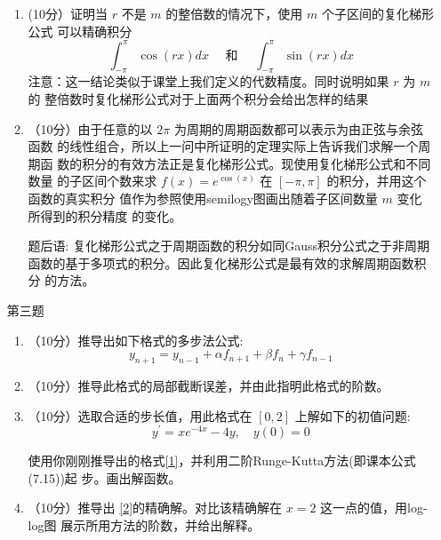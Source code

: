 \documentclass[12pt,a4paper,UTF8]{ctexart}
\theoremstyle{nonumberplain}
\begin{document}
\begin{enumerate}
          \begin{enumerate}
              \item
                    (10分）证明当 $r$ 不是 $m$ 的整倍数的情况下，使用 $m$ 个子区间的复化梯形公式
                    可以精确积分
                    $$
                        \int_{-\pi}^{\pi} \cos (r x) d x \quad \text { 和 } \quad \int_{-\pi}^{\pi} \sin (r x) d x
                    $$
                    注意：这一结论类似于课堂上我们定义的代数精度。同时说明如果 $r$ 为 $m$ 的
                    整倍数时复化梯形公式对于上面两个积分会给出怎样的结果
              \item （10分）由于任意的以 $2 \pi$ 为周期的周期函数都可以表示为由正弦与余弦函数 的线性组合，所以上一问中所证明的定理实际上告诉我们求解一个周期函 数的积分的有效方法正是复化梯形公式。现使用复化梯形公式和不同数量 的子区间个数来求 $f(x)=e^{\cos (x)}$ 在 $[-\pi, \pi]$ 的积分，并用这个函数的真实积分 值作为参照使用semilogy图画出随着子区间数量 $m$ 变化所得到的积分精度 的变化。
                    \par 题后语: 复化梯形公式之于周期函数的积分如同Gauss积分公式之于非周期
                    函数的基于多项式的积分。因此复化梯形公式是最有效的求解周期函数积分 的方法。
          \end{enumerate}
    \item[第三题]
          \begin{enumerate}
              \item （10分）推导出如下格式的多步法公式:
                    \begin{equation}\label{1}
                        y_{n+1}=y_{n-1}+\alpha f_{n+1}+\beta f_{n}+\gamma f_{n-1}
                    \end{equation}
              \item （10分）推导此格式的局部截断误差，并由此指明此格式的阶数。
              \item （10分）选取合适的步长值，用此格式在 $[0,2]$ 上解如下的初值问题:
                    \begin{equation}\label{2}
                        y^{\prime}=x e^{-4 x}-4 y, \quad y(0)=0
                    \end{equation}

                    使用你刚刚推导出的格式\ref{1}，并利用二阶Runge-Kutta方法(即课本公式(7.15))起 步。画出解函数。
              \item （10分）推导出 \ref{2}的精确解。对比该精确解在 $x=2$ 这一点的值，用log-log图 展示所用方法的阶数，并给出解释。
          \end{enumerate}
\end{enumerate}
\end{document}
